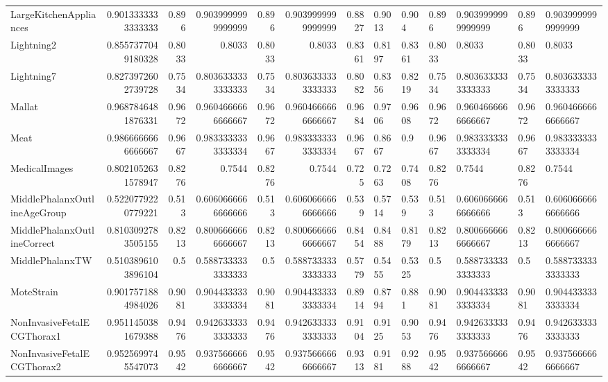 \begin{table}[t]
\begin{tabular}{lrrrrrr}
LargeKitchenAppliances & 0.9013333333333333 & 0.896 & 0.9039999999999999 & 0.896 & 0.9039999999999999 & 0.8827 & 0.9013 & 0.904 & 0.896 & 0.9039999999999999 & 0.896 & 0.9039999999999999 \\
Lightning2 & 0.8557377049180328 & 0.8033 & 0.8033 & 0.8033 & 0.8033 & 0.8361 & 0.8197 & 0.8361 & 0.8033 & 0.8033 & 0.8033 & 0.8033 \\
Lightning7 & 0.8273972602739728 & 0.7534 & 0.8036333333333333 & 0.7534 & 0.8036333333333333 & 0.8082 & 0.8356 & 0.8219 & 0.7534 & 0.8036333333333333 & 0.7534 & 0.8036333333333333 \\
Mallat & 0.9687846481876331 & 0.9672 & 0.9604666666666667 & 0.9672 & 0.9604666666666667 & 0.9684 & 0.9706 & 0.9608 & 0.9672 & 0.9604666666666667 & 0.9672 & 0.9604666666666667 \\
Meat & 0.9866666666666667 & 0.9667 & 0.9833333333333334 & 0.9667 & 0.9833333333333334 & 0.9667 & 0.8667 & 0.9 & 0.9667 & 0.9833333333333334 & 0.9667 & 0.9833333333333334 \\
MedicalImages & 0.8021052631578947 & 0.8276 & 0.7544 & 0.8276 & 0.7544 & 0.725 & 0.7263 & 0.7408 & 0.8276 & 0.7544 & 0.8276 & 0.7544 \\
MiddlePhalanxOutlineAgeGroup & 0.5220779220779221 & 0.513 & 0.6060666666666666 & 0.513 & 0.6060666666666666 & 0.539 & 0.5714 & 0.539 & 0.513 & 0.6060666666666666 & 0.513 & 0.6060666666666666 \\
MiddlePhalanxOutlineCorrect & 0.8103092783505155 & 0.8213 & 0.8006666666666667 & 0.8213 & 0.8006666666666667 & 0.8454 & 0.8488 & 0.8179 & 0.8213 & 0.8006666666666667 & 0.8213 & 0.8006666666666667 \\
MiddlePhalanxTW & 0.5103896103896104 & 0.5 & 0.5887333333333333 & 0.5 & 0.5887333333333333 & 0.5779 & 0.5455 & 0.5325 & 0.5 & 0.5887333333333333 & 0.5 & 0.5887333333333333 \\
MoteStrain & 0.9017571884984026 & 0.9081 & 0.9044333333333334 & 0.9081 & 0.9044333333333334 & 0.8914 & 0.8794 & 0.881 & 0.9081 & 0.9044333333333334 & 0.9081 & 0.9044333333333334 \\
NonInvasiveFetalECGThorax1 & 0.9511450381679388 & 0.9476 & 0.9426333333333333 & 0.9476 & 0.9426333333333333 & 0.9104 & 0.9125 & 0.9053 & 0.9476 & 0.9426333333333333 & 0.9476 & 0.9426333333333333 \\
NonInvasiveFetalECGThorax2 & 0.9525699745547073 & 0.9542 & 0.9375666666666667 & 0.9542 & 0.9375666666666667 & 0.9313 & 0.9181 & 0.9288 & 0.9542 & 0.9375666666666667 & 0.9542 & 0.9375666666666667 \\

\end{tabular}
\end{table}
